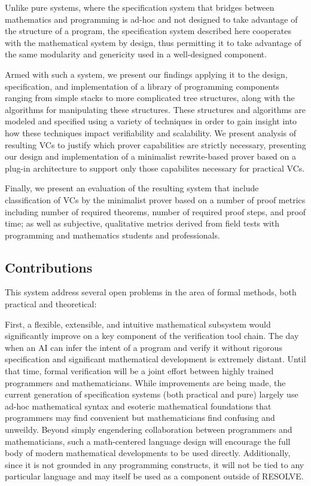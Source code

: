 Unlike pure systems, where the specification system that bridges between mathematics and programming is ad-hoc and not designed to take advantage of the structure of a program, the specification system described here cooperates with the mathematical system by design, thus permitting it to take advantage of the same modularity and genericity used in a well-designed component.

Armed with such a system, we present our findings applying it to the design, specification, and implementation of a library of programming components ranging from simple stacks to more complicated tree structures, along with the algorithms for manipulating these structures.  These structures and algorithms are modeled and specified using a variety of techniques in order to gain insight into how these techniques impact verifiability and scalability.  We present analysis of resulting VCs to justify which prover capabilities are strictly necessary, presenting our design and implementation of a minimalist rewrite-based prover based on a plug-in architecture to support only those capabilites necessary for practical VCs.

Finally, we present an evaluation of the resulting system that include classification of VCs by the minimalist prover based on a number of proof metrics including number of required theorems, number of required proof steps, and proof time; as well as subjective, qualitative metrics derived from field tests with programming and mathematics students and professionals.

\subsection{Contributions\label{sec:contributions}}
This system address several open problems in the area of formal methods, both practical and theoretical:

First, a flexible, extensible, and intuitive mathematical subsystem would significantly improve on a key component of the verification tool chain.  The day when an AI can infer the intent of a program and verify it without rigorous specification and significant mathematical development is extremely distant.  Until that time, formal verification will be a joint effort between highly trained programmers and mathematicians.  While improvements are being made\cite{wenzelIsar}, the current generation of specification systems (both practical and pure) largely use ad-hoc mathematical syntax and esoteric mathematical foundations that programmers may find convenient but mathematicians find confusing and unweildy.  Beyond simply engendering collaboration between programmers and mathematicians, such a math-centered language design will encourage the full body of modern mathematical developments to be used directly.  Additionally, since it is not grounded in any programming constructs, it will not be tied to any particular language and may itself be used as a component outside of RESOLVE.

